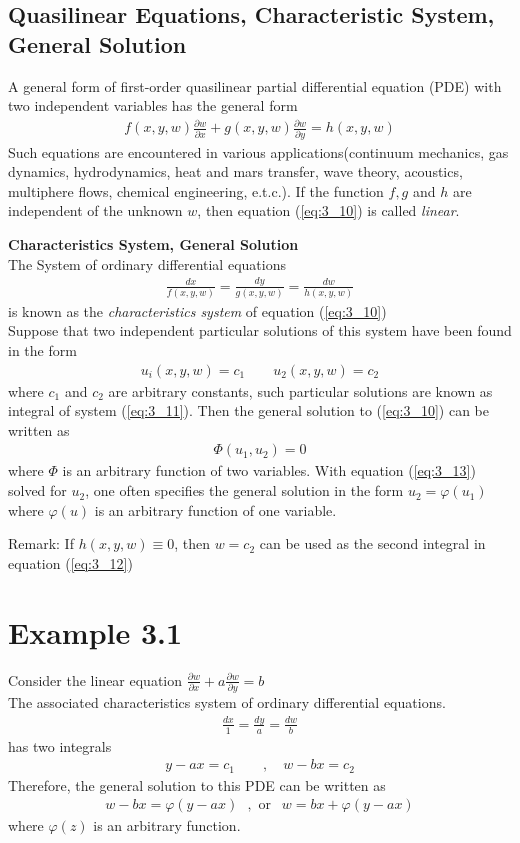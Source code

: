 \documentclass[11pt]{report}
\newcommand{\NI}{\noindent}
\newcommand{\sps}{\\[0.2cm]}
\newcommand{\refn}[1]{(\ref{#1})}
\newcommand{\refx}[1]{\refn{eq:#1}}
\newcommand{\bt}[1]{\textbf{#1}}
\newcommand{\dsp}{\displaystyle}
\begin{document}
	\subsection{Quasilinear Equations, Characteristic System, General Solution} 
	A general form of first-order quasilinear partial differential equation (PDE) with two independent variables has the general form
	\begin{eqnarray}
		f(x,y,w)\frac{\partial w}{\partial x} + g(x,y,w)\frac{\partial w}{\partial y}= h(x,y,w)\label{eq:3_10}
	\end{eqnarray}
	Such equations are encountered in various applications(continuum mechanics, gas dynamics, hydrodynamics, heat and mars transfer, wave theory, acoustics, multiphere flows, chemical engineering, e.t.c.). If the function $f,g$ and $h$ are independent of the unknown $w$, then equation \refx{3_10} is called \textit{linear}.
	
	\NI\bt{Characteristics System, General Solution}\sps
	The System of ordinary differential equations
	\begin{eqnarray}
		\frac{dx}{f(x,y,w)} = \frac{dy}{g(x,y,w)} = \frac{dw}{h(x,y,w)} \label{eq:3_11}
	\end{eqnarray}
	is known as the \textit{characteristics system} of equation \refx{3_10}\sps
	Suppose that two independent particular solutions of this system have been found in the form
	\begin{eqnarray}
		u_i(x,y,w) =c_1\qquad u_2(x,y,w)=c_2\label{eq:3_12}
	\end{eqnarray}
	where $c_1$ and $c_2$ are arbitrary constants, such particular solutions are known as integral of system \refx{3_11}. Then the general solution to \refx{3_10} can be written as
	\begin{eqnarray}
		\Phi(u_1,u_2) = 0 \label{eq:3_13}
	\end{eqnarray}
	where $\Phi$ is an arbitrary function of two variables. With equation \refx{3_13} solved for $u_2$, one often specifies the general solution in the form $u_2 = \varphi(u_1)$ where $\varphi(u)$ is an arbitrary function of one variable.
	
	\NI Remark: If $h(x,y,w)\equiv 0$, then $w=c_2$ can be used as the second integral in equation \refx{3_12}\sps
	
	\section*{Example 3.1}
	Consider the linear equation $\dsp \frac{\partial w}{\partial x} + a \frac{\partial w}{\partial y} = b$\sps
	The associated characteristics system of ordinary differential equations.
	\begin{eqnarray*}
		\frac{dx}{1} = \frac{dy}{a} = \frac{dw}{b}
	\end{eqnarray*}
	has two integrals
	\begin{eqnarray*}
		y-ax=c_1\qquad , \quad w-bx = c_2
	\end{eqnarray*}
	Therefore, the general solution to this PDE can be written as
	\begin{eqnarray*}
		w-bx=\varphi(y-ax)~~~, \text{ or } ~~ w=bx+\varphi(y-ax)
	\end{eqnarray*}
	where $\varphi(z)$ is an arbitrary function.
	
\end{document}
